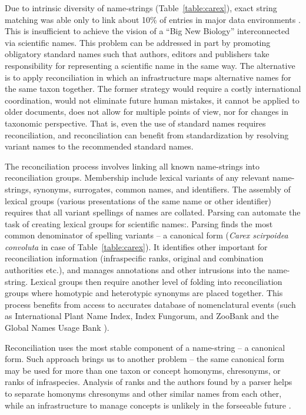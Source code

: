 \documentclass{bmcart}
\begin{document}
Due to intrinsic diversity of name-strings (Table~\ref{table:carex}), exact
string matching was able only to link about 10\% of entries in major data
environments \cite{Patterson:inpress-a}. This is insufficient to achieve the
vision of a ``Big New Biology'' interconnected via scientific names. This
problem can be addressed in part by promoting obligatory standard names such
that authors, editors and publishers take responsibility for representing a
scientific name in the same way. The alternative is to apply reconciliation in
which an infrastructure maps alternative names for the same taxon together.
The former strategy would require a costly international coordination, would
not eliminate future human mistakes, it cannot be applied to older documents,
does not allow for multiple points of view, nor for changes in taxonomic
perspective. That is, even the use of standard names requires reconciliation,
and reconciliation can benefit from standardization by resolving variant names
to the recommended standard names.

The reconciliation process involves linking all known name-strings into
reconciliation groups. Membership include lexical variants of any relevant
name-strings, synonyms, surrogates, common names, and identifiers.  The
assembly of lexical groups (various presentations of the same name or other
identifier) requires that all variant spellings of names are collated. Parsing
can automate the task of creating lexical groups for scientific names:. Parsing
finds the most common denominator of spelling variants – a canonical form
(\textit{Carex scirpoidea convoluta} in case of Table~\ref{table:carex}). It
identifies other important for reconciliation information (infraspecific ranks,
original and combination authorities etc.), and manages annotations and other
intrusions into the name-string. Lexical groups then require another level of
folding into reconciliation groups where homotypic and heterotypic synonyms are
placed together. This process benefits from access to accurates database of
nomenclatural events (such as International Plant Name Index, Index Fungorum,
and ZooBank and the Global Names Usage Bank \cite{Pyle2003}).

Reconciliation uses the most stable component of a name-string – a canonical
form. Such approach brings us to another problem – the same canonical form may
be used for more than one taxon or concept \cite{Remsen2016} homonyms, chresonyms,
or ranks of infraspecies. Analysis of ranks and the authors found by a parser
helps to separate homonyms chresonyms and other  similar names from each other,
while an infrastructure to manage concepts is unlikely in the forseeable future
\cite{Patterson:inpress-a}.
\end{document}
